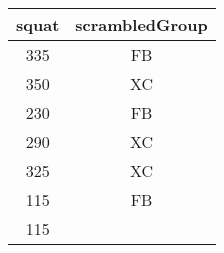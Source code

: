 \documentclass[]{book}
\theoremstyle{definition}
\theoremstyle{definition}
\theoremstyle{definition}
\theoremstyle{remark}
\begin{document}
\begin{longtable}[]{@{}cc@{}}
\toprule
\begin{minipage}[b]{0.10\columnwidth}\centering\strut
squat\strut
\end{minipage} & \begin{minipage}[b]{0.21\columnwidth}\centering\strut
scrambledGroup\strut
\end{minipage}\tabularnewline
\midrule
\endhead
\begin{minipage}[t]{0.10\columnwidth}\centering\strut
335\strut
\end{minipage} & \begin{minipage}[t]{0.21\columnwidth}\centering\strut
FB\strut
\end{minipage}\tabularnewline
\begin{minipage}[t]{0.10\columnwidth}\centering\strut
350\strut
\end{minipage} & \begin{minipage}[t]{0.21\columnwidth}\centering\strut
XC\strut
\end{minipage}\tabularnewline
\begin{minipage}[t]{0.10\columnwidth}\centering\strut
230\strut
\end{minipage} & \begin{minipage}[t]{0.21\columnwidth}\centering\strut
FB\strut
\end{minipage}\tabularnewline
\begin{minipage}[t]{0.10\columnwidth}\centering\strut
290\strut
\end{minipage} & \begin{minipage}[t]{0.21\columnwidth}\centering\strut
XC\strut
\end{minipage}\tabularnewline
\begin{minipage}[t]{0.10\columnwidth}\centering\strut
325\strut
\end{minipage} & \begin{minipage}[t]{0.21\columnwidth}\centering\strut
XC\strut
\end{minipage}\tabularnewline
\begin{minipage}[t]{0.10\columnwidth}\centering\strut
115\strut
\end{minipage} & \begin{minipage}[t]{0.21\columnwidth}\centering\strut
FB\strut
\end{minipage}\tabularnewline
\begin{minipage}[t]{0.10\columnwidth}\centering\strut
115\strut
\end{minipage} & \begin{minipage}[t]{0.21\columnwidth}\centering\strut

\end{minipage}
\end{longtable}
\end{document}
